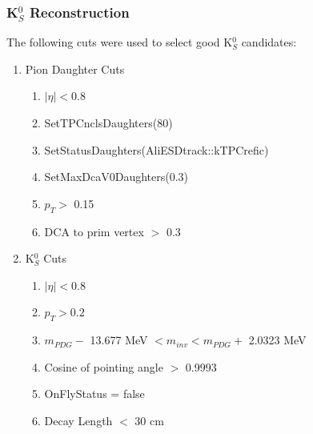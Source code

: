 \documentclass[../AnalysisNoteJBuxton.tex]{subfiles}
\begin{document}
\subsubsection{\texorpdfstring{K$^{0}_{S}$}{TEXT} Reconstruction}
\label{K0sReconstruction}

The following cuts were used to select good K$^{0}_{S}$ candidates:

\begin{enumerate}
 \item{Pion Daughter Cuts}
 \begin{enumerate}
  \item $|\eta| < 0.8$
  \item SetTPCnclsDaughters(80)
  \item SetStatusDaughters(AliESDtrack::kTPCrefic)
  \item SetMaxDcaV0Daughters(0.3)
  \item $p_{T} >$ 0.15
  \item DCA to prim vertex $>$ 0.3
 \end{enumerate}

 \item K$^{0}_{S}$ Cuts
 \begin{enumerate}
  \item $|\eta| < 0.8$
  \item $p_{T} > 0.2$
  \item $m_{PDG} -$ 13.677 MeV $< m_{inv} < m_{PDG} +$ 2.0323 MeV
  \item Cosine of pointing angle $>$ 0.9993
  \item OnFlyStatus = false
  \item Decay Length $<$ 30 cm
 \end{enumerate}  
 
\end{enumerate}
\end{document}
